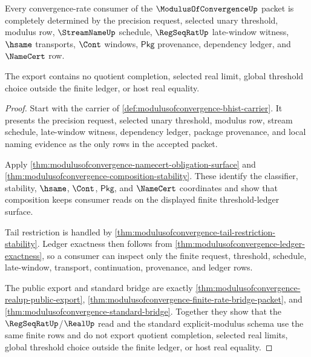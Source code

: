 \begin{theorem}
\label{thm:modulusofconvergence-threshold-ledger-completeness}
Every convergence-rate consumer of the $\ModulusOfConvergenceUp$ packet is
completely determined by the precision request, selected unary threshold,
modulus row, $\StreamNameUp$ schedule, $\RegSeqRatUp$ late-window witness,
$\hsame$ transports, $\Cont$ windows, $\mathsf{Pkg}$ provenance, dependency
ledger, and $\NameCert$ row.

The export contains no quotient completion, selected real limit, global
threshold choice outside the finite ledger, or host real equality.
\end{theorem}
\begin{proof}
Start with the carrier of
\autoref{def:modulusofconvergence-bhist-carrier}. It presents the precision
request, selected unary threshold, modulus row, stream schedule,
late-window witness, dependency ledger, package provenance, and local naming
evidence as the only rows in the accepted packet.

Apply \autoref{thm:modulusofconvergence-namecert-obligation-surface} and
\autoref{thm:modulusofconvergence-composition-stability}. These identify the
classifier, stability, $\hsame$, $\Cont$, $\mathsf{Pkg}$, and $\NameCert$
coordinates and show that composition keeps consumer reads on the displayed
finite threshold-ledger surface.

Tail restriction is handled by
\autoref{thm:modulusofconvergence-tail-restriction-stability}. Ledger exactness
then follows from \autoref{thm:modulusofconvergence-ledger-exactness}, so a
consumer can inspect only the finite request, threshold, schedule,
late-window, transport, continuation, provenance, and ledger rows.

The public export and standard bridge are exactly
\autoref{thm:modulusofconvergence-realup-public-export},
\autoref{thm:modulusofconvergence-finite-rate-bridge-packet}, and
\autoref{thm:modulusofconvergence-standard-bridge}. Together they show that
the $\RegSeqRatUp$/$\RealUp$ read and the standard explicit-modulus schema use
the same finite rows and do not export quotient completion, selected real
limits, global threshold choice outside the finite ledger, or host real
equality.
\end{proof}

